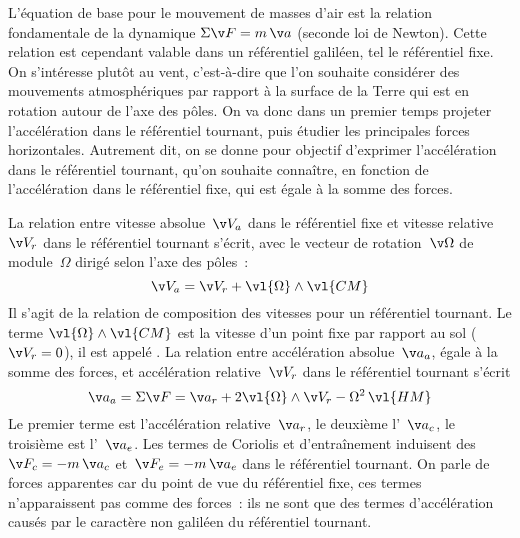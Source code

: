 \sk
L'équation de base pour le mouvement de masses d'air est la relation fondamentale de la dynamique $\Sigma \v F=m \, \v a$ (seconde loi de Newton).  Cette relation est cependant valable dans un référentiel galiléen, tel le référentiel fixe. On s'intéresse plutôt au vent, c'est-à-dire que l'on souhaite considérer des mouvements atmosphériques par rapport à la surface de la Terre qui est en rotation autour de l'axe des pôles. On va donc dans un premier temps projeter l'accélération dans le référentiel tournant, puis étudier les principales forces horizontales. Autrement dit, on se donne pour objectif d'exprimer l'accélération dans le référentiel tournant, qu'on souhaite connaître, en fonction de l'accélération dans le référentiel fixe, qui est égale à la somme des forces.

\sk
La relation entre vitesse absolue~$\v V_a$ dans le référentiel fixe et vitesse relative~$\v V_r$ dans le référentiel tournant s'écrit, avec le vecteur de rotation~$\v \Omega$ de module~$\Omega$ dirigé selon l'axe des pôles~:
\[\v V_a = \v V_r + \vl{\Omega}\wedge\vl{CM}\]
Il s'agit de la relation de composition des vitesses pour un référentiel tournant. Le terme $\vl{\Omega}\wedge\vl{CM}$ est la vitesse d'un point fixe par rapport au sol ($\v V_r=0$), il est appelé .
La relation entre accélération absolue~$\v a_a$, égale à la somme des forces, et accélération relative~$\v V_r$ dans le référentiel tournant s'écrit
\[ \v a_a=\Sigma\v F=\v a_r+2\vl{\Omega}\wedge\v V_r-\Omega^2\,\vl{HM} \]
Le premier terme est l'accélération relative~$\v a_r$, le deuxième l'~$\v a_c$, le troisième est l'~$\v a_e$. Les termes de Coriolis et d'entraînement induisent des ~$\v F_c = -m \, \v a_c$ et~$\v F_e = -m \, \v a_e$ dans le référentiel tournant. On parle de forces apparentes car du point de vue du référentiel fixe, ces termes n'apparaissent pas comme des forces~: ils ne sont que des termes d'accélération causés par le caractère non galiléen du référentiel tournant.

